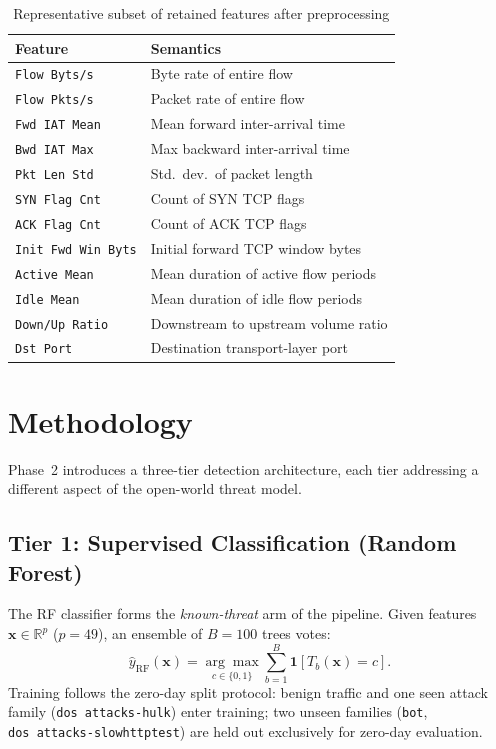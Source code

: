 \documentclass[10pt,conference]{IEEEtran}
\begin{document}
\begin{table}[htbp]
\centering
\caption{Representative subset of retained features after preprocessing}
\label{tab:features}
\begin{tabular}{ll}
\toprule
\textbf{Feature} & \textbf{Semantics} \\
\midrule
\texttt{Flow Byts/s}   & Byte rate of entire flow \\
\texttt{Flow Pkts/s}   & Packet rate of entire flow \\
\texttt{Fwd IAT Mean}  & Mean forward inter-arrival time \\
\texttt{Bwd IAT Max}   & Max backward inter-arrival time \\
\texttt{Pkt Len Std}   & Std.\ dev.\ of packet length \\
\texttt{SYN Flag Cnt}  & Count of SYN TCP flags \\
\texttt{ACK Flag Cnt}  & Count of ACK TCP flags \\
\texttt{Init Fwd Win Byts} & Initial forward TCP window bytes \\
\texttt{Active Mean}   & Mean duration of active flow periods \\
\texttt{Idle Mean}     & Mean duration of idle flow periods \\
\texttt{Down/Up Ratio} & Downstream to upstream volume ratio \\
\texttt{Dst Port}      & Destination transport-layer port \\
\bottomrule
\end{tabular}
\end{table}

\section{Methodology}
\label{sec:methodology}

Phase~2 introduces a three-tier detection architecture, each tier
addressing a different aspect of the open-world threat model.

\subsection{Tier 1: Supervised Classification (Random Forest)}

The RF classifier forms the \emph{known-threat} arm of the pipeline.
Given features $\mathbf{x} \in \mathbb{R}^{p}$ ($p=49$), an ensemble
of $B=100$ trees votes:
\begin{equation}
  \hat{y}_{\text{RF}}(\mathbf{x})
  = \underset{c \in \{0,1\}}{\arg\max}
    \sum_{b=1}^{B} \mathbf{1}\!\left[T_b(\mathbf{x}) = c\right].
  \label{eq:rf}
\end{equation}
Training follows the zero-day split protocol: benign traffic and one
seen attack family (\texttt{dos~attacks-hulk}) enter training; two
unseen families (\texttt{bot}, \texttt{dos~attacks-slowhttptest}) are
held out exclusively for zero-day evaluation.
\end{document}
